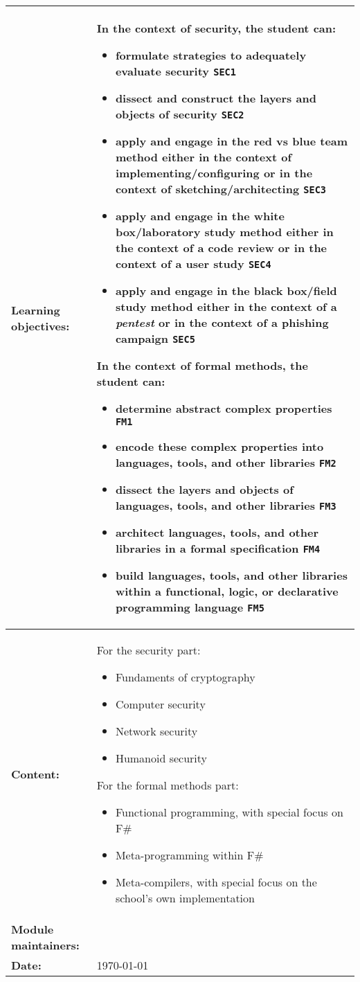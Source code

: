 \begin{tabularx}{\textwidth}{|>{\columncolor{lichtGrijs}} p{}|X|}
	\hline
	\textbf{Learning objectives:} &
	In the context of security, the student can:
	\begin{itemize}
		\item formulate strategies to adequately evaluate security \texttt{SEC1}
		\item dissect and construct the layers and objects of security \texttt{SEC2}
		\item apply and engage in the red vs blue team method either in the context of implementing/configuring or in the context of sketching/architecting \texttt{SEC3}
		\item apply and engage in the white box/laboratory study method either in the context of a code review or in the context of a user study \texttt{SEC4}
		\item apply and engage in the black box/field study method either in the context of a \textit{pentest} or in the context of a phishing campaign \texttt{SEC5}
	\end{itemize}

	In the context of formal methods, the student can:
	\begin{itemize}
		\item determine abstract complex properties \texttt{FM1}
		\item encode these complex properties into languages, tools, and other libraries \texttt{FM2}
		\item dissect the layers and objects of languages, tools, and other libraries \texttt{FM3}
		\item architect languages, tools, and other libraries in a formal specification \texttt{FM4}
		\item build languages, tools, and other libraries within a functional, logic, or declarative programming language \texttt{FM5}
	\end{itemize} \\
	\hline
	\textbf{Content:} &
	For the security part:
	\begin{itemize}
		\item Fundaments of cryptography
		\item Computer security
		\item Network security
		\item Humanoid security
	\end{itemize}
	
	For the formal methods part:
	\begin{itemize}
		\item Functional programming, with special focus on F\#
		\item Meta-programming within F\#
		\item Meta-compilers, with special focus on the school's own implementation
	\end{itemize}\\
	\hline
	\textbf{Module maintainers:} & \author\\
	\hline
	\textbf{Date:} & \today \\
	\hline
\end{tabularx}
\newpage

